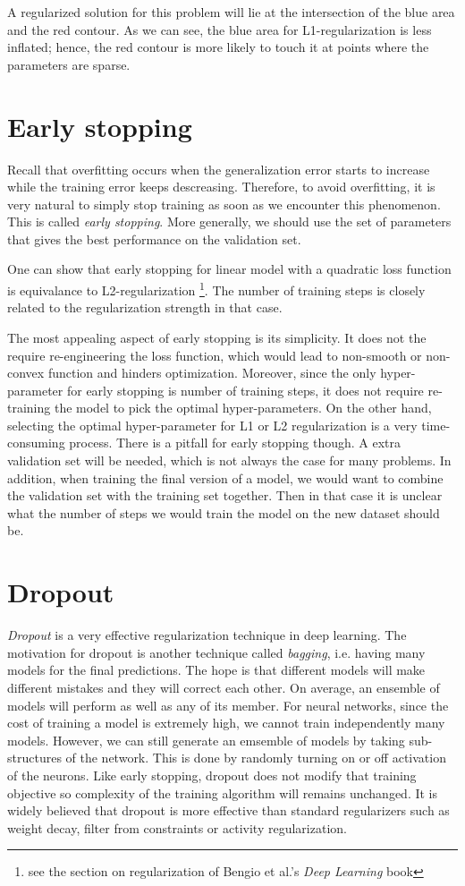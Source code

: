 \documentclass[11pt,letterpaper]{article}
\begin{document}
A regularized solution for this problem will lie at the intersection of the blue area and the red contour. As we can see, the blue area for L1-regularization is less inflated; hence, the red contour is more likely to touch it at points where the parameters are sparse. 

\section{Early stopping}

Recall that overfitting occurs when the generalization error starts to increase while the training error keeps descreasing. Therefore, to avoid overfitting, it is very natural to simply stop training as soon as we encounter this phenomenon. This is called \emph{early stopping}. More generally, we should use the set of parameters that gives the best performance on the validation set. 

One can show that early stopping for linear model with a quadratic loss function is equivalance to L2-regularization \footnote{see the section on regularization of Bengio et al.'s \emph{Deep Learning} book}. The number of training steps is closely related to the regularization strength in that case.

The most appealing aspect of early stopping is its simplicity. It does not the require re-engineering the loss function, which would lead to non-smooth or non-convex function and hinders optimization. Moreover, since the only hyper-parameter for early stopping is number of training steps, it does not require re-training the model to pick the optimal hyper-parameters. On the other hand, selecting the optimal hyper-parameter for L1 or L2 regularization is a very time-consuming process. There is a pitfall for early stopping though. A extra validation set will be needed, which is not always the case for many problems. In addition, when training the final version of a model, we would want to combine the validation set with the training set together. Then in that case it is unclear what the number of steps we would train the model on the new dataset should be.   

\section{Dropout}

\emph{Dropout} is a very effective regularization technique in deep learning. The motivation for dropout is another technique called \emph{bagging}, i.e. having many models for the final predictions. The hope is that different models will make different mistakes and they will correct each other. On average, an ensemble of models will perform as well as any of its member. For neural networks, since the cost of training a model is extremely high, we cannot train independently many models. However, we can still generate an emsemble of models by taking sub-structures of the network. This is done by randomly turning on or off activation of the neurons. Like early stopping, dropout does not modify that training objective so complexity of the training algorithm will remains unchanged. It is widely believed that dropout is more effective than standard regularizers such as weight decay, filter from constraints or activity regularization.   
\end{document}
